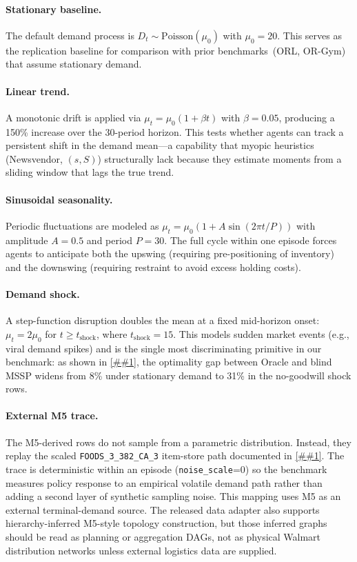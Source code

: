 \documentclass[10pt,a4paper]{article}
\providecommand{\Cref}[1]{\ref{##1}}
\begin{document}
\paragraph{Stationary baseline.}
The default demand process is $D_t \sim \text{Poisson}(\mu_0)$ with
$\mu_0 = 20$. This serves as the replication baseline for comparison
with prior benchmarks~(ORL, OR-Gym) that assume stationary demand.

\paragraph{Linear trend.}
A monotonic drift is applied via $\mu_t = \mu_0 (1 + \beta t)$ with
$\beta = 0.05$, producing a 150\% increase over the 30-period horizon.
This tests whether agents can track a persistent shift in the demand
mean---a capability that myopic heuristics (Newsvendor, $(s,S)$)
structurally lack because they estimate moments from a sliding window
that lags the true trend.

\paragraph{Sinusoidal seasonality.}
Periodic fluctuations are modeled as
$\mu_t = \mu_0 (1 + A \sin(2\pi t / P))$ with amplitude $A = 0.5$
and period $P = 30$. The full cycle within one episode forces agents
to anticipate both the upswing (requiring pre-positioning of inventory)
and the downswing (requiring restraint to avoid excess holding costs).

\paragraph{Demand shock.}
A step-function disruption doubles the mean at a fixed mid-horizon onset:
$\mu_t = 2\mu_0$ for $t \geq t_{\text{shock}}$, where $t_{\text{shock}} = 15$.
This models sudden market events (e.g., viral demand spikes)
and is the single most discriminating primitive in our benchmark:
as shown in \Cref{sec:results}, the optimality gap between Oracle
and blind MSSP widens from 8\% under stationary demand to 31\% in
the no-goodwill shock rows.

\paragraph{External M5 trace.}
The M5-derived rows do not sample from a parametric distribution.
Instead, they replay the scaled \texttt{FOODS\_3\_382\_CA\_3}
item-store path documented in \Cref{app:scenarios}. The trace is
deterministic within an episode (\texttt{noise\_scale}=0) so the
benchmark measures policy response to an empirical volatile demand path
rather than adding a second layer of synthetic sampling noise. This
mapping uses M5 as an external terminal-demand source. The released data
adapter also supports hierarchy-inferred M5-style topology construction,
but those inferred graphs should be read as planning or aggregation DAGs,
not as physical Walmart distribution networks unless external logistics
data are supplied.
\end{document}
